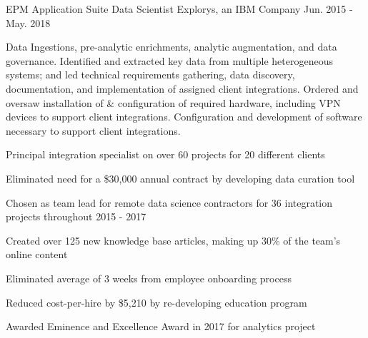 \begin{cventries}
  \cventry
    {EPM Application Suite} %
    {Data Scientist}
    {Explorys, an IBM Company}
    {Jun. 2015 - May. 2018}
    {
      \begin{cvparagraph}
        Data Ingestions, pre-analytic enrichments, analytic augmentation, and data governance.  Identified and extracted key data from multiple heterogeneous systems; and led technical requirements gathering, data discovery, documentation, and implementation of assigned client integrations.  Ordered and oversaw installation of \& configuration of required hardware, including VPN devices to support client integrations.  Configuration and development of software necessary to support client integrations.
      \end{cvparagraph}
      \begin{cvitems} %
        \item {Principal integration specialist on over 60 projects for 20 different clients}
        \item {Eliminated need for a \$30,000 annual contract by developing data curation tool}
        \item {Chosen as team lead for  remote data science contractors for 36 integration projects throughout 2015 - 2017}
        \item {Created over 125 new knowledge base articles, making up 30\% of the team's online content}
        \item {Eliminated average of 3 weeks from employee onboarding process}
        \item {Reduced cost-per-hire by \$5,210 by re-developing education program}
        \item {Awarded Eminence and Excellence Award in 2017 for analytics project}
      \end{cvitems}
    }


\end{cventries}
